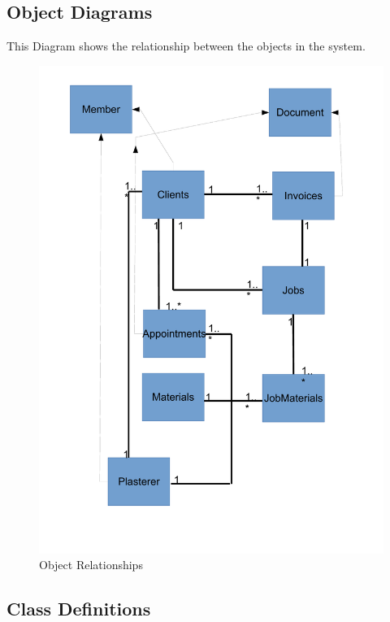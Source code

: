 \subsection{Object Diagrams}
\begin{flushleft}
This Diagram shows the relationship between the objects in the system.
\end{flushleft}
\begin{figure}[H]
\includegraphics[scale=0.5]{./Design/images/ObjectDiagram.pdf}
    \caption{Object Relationships} 
\label{fig:ObjectDiagram}
\end{figure}



\pagebreak
\subsection{Class Definitions}


